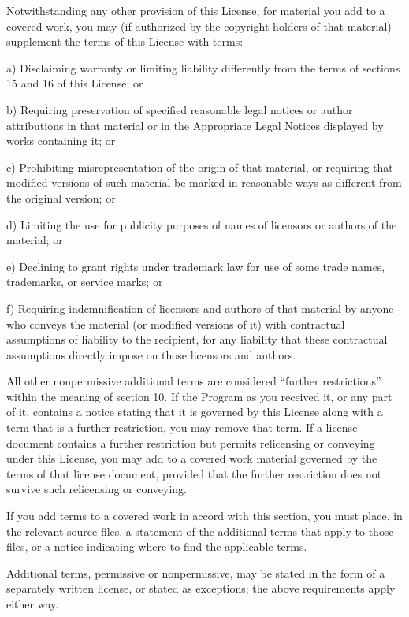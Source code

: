 \documentclass[letterpaper,10pt,english]{sphinxmanual}
\begin{document}
\begin{sphinxVerbatim}[commandchars=\\\{\}]
    Notwithstanding any other provision of this License, for material you add
    to a covered work, you may (if authorized by the copyright holders of that
    material) supplement the terms of this License with terms:

    a) Disclaiming warranty or limiting liability differently from the terms of
       sections 15 and 16 of this License; or

    b) Requiring preservation of specified reasonable legal notices or author
       attributions in that material or in the Appropriate Legal Notices
       displayed by works containing it; or

    c) Prohibiting misrepresentation of the origin of that material, or
       requiring that modified versions of such material be marked in
       reasonable ways as different from the original version; or

    d) Limiting the use for publicity purposes of names of licensors or authors
       of the material; or

    e) Declining to grant rights under trademark law for use of some trade
       names, trademarks, or service marks; or

    f) Requiring indemnification of licensors and authors of that material by
       anyone who conveys the material (or modified versions of it) with
       contractual assumptions of liability to the recipient, for any liability
       that these contractual assumptions directly impose on those licensors
       and authors.

    All other non\PYGZhy{}permissive additional terms are considered “further
    restrictions” within the meaning of section 10. If the Program as you
    received it, or any part of it, contains a notice stating that it is
    governed by this License along with a term that is a further restriction,
    you may remove that term. If a license document contains a further
    restriction but permits relicensing or conveying under this License, you
    may add to a covered work material governed by the terms of that license
    document, provided that the further restriction does not survive such
    relicensing or conveying.

    If you add terms to a covered work in accord with this section, you must
    place, in the relevant source files, a statement of the additional terms
    that apply to those files, or a notice indicating where to find the
    applicable terms.

    Additional terms, permissive or non\PYGZhy{}permissive, may be stated in the form
    of a separately written license, or stated as exceptions; the above
    requirements apply either way.


\end{sphinxVerbatim}
\end{document}
